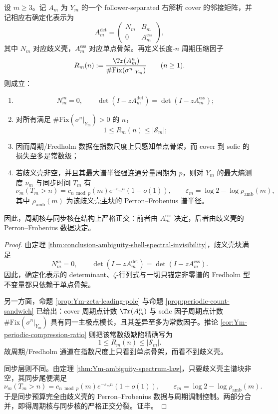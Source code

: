 \begin{theorem}[序列层审计的周期核与同步核严格正交]\label{thm:conclusion-sequence-layer-periodic-sync-kernel-orthogonality}
设 \(m\ge 3\)。记 \(A_m\) 为 \(Y_m\) 的一个 follower-separated 右解析 cover 的邻接矩阵，并记相应右确定化表示为
\[
A_m^{\det}
=
\begin{pmatrix}
N_m & B_m\\
0 & A_m^{\mathrm{ess}}
\end{pmatrix},
\]
其中 \(N_m\) 对应歧义壳，\(A_m^{\mathrm{ess}}\) 对应单点骨架。再定义长度-\(n\) 周期压缩因子
\[
R_m(n):=
\frac{\Tr(A_m^n)}{\#\mathrm{Fix}(\sigma^n|_{Y_m})}
\qquad (n\ge 1).
\]
则成立：
\begin{enumerate}
  \item
  \[
  N_m^m=0,
  \qquad
  \det(I-zA_m^{\det})=\det(I-zA_m^{\mathrm{ess}});
  \]
  \item 对所有满足 \(\#\mathrm{Fix}(\sigma^n|_{Y_m})>0\) 的 \(n\)，
  \[
  1\le R_m(n)\le |\mathcal S_m|;
  \]
  \item 因而周期/Fredholm 数据在指数尺度上只感知单点骨架，而 cover 到 sofic 的损失至多是常数级；
  \item 若歧义壳非空，并且其最大谱半径强连通分量周期为 \(p\)，则对 \(Y_m\) 的最大熵测度 \(\nu_m\) 与同步时间 \(T_m\) 有
  \[
  \nu_m(T_m>n)=c_{n\bmod p}(m)e^{-\varepsilon_m n}(1+o(1)),
  \qquad
  \varepsilon_m=\log 2-\log \rho_{\mathrm{amb}}(m),
  \]
  其中 \(\rho_{\mathrm{amb}}(m)\) 为该歧义壳主块的 Perron--Frobenius 谱半径。
\end{enumerate}
因此，周期核与同步核在结构上严格正交：前者由 \(A_m^{\mathrm{ess}}\) 决定，后者由歧义壳的 Perron--Frobenius 数据决定。
\end{theorem}
\begin{proof}
由定理 \ref{thm:conclusion-ambiguity-shell-spectral-invisibility}，歧义壳块满足
\[
N_m^m=0,
\qquad
\det(I-zA_m^{\det})=\det(I-zA_m^{\mathrm{ess}}).
\]
因此，确定化表示的 determinant、\(\zeta\)-行列式与一切只锚定非零谱的 Fredholm 型不变量都只依赖于单点骨架。

另一方面，命题 \ref{prop:Ym-zeta-leading-pole} 与命题 \ref{prop:periodic-count-sandwich} 已给出：cover 周期点计数 \(\Tr(A_m^n)\) 与 sofic 因子周期点计数 \(\#\mathrm{Fix}(\sigma^n|_{Y_m})\) 具有同一主极点模长，且其差异至多为常数因子。推论 \ref{cor:Ym-periodic-compression-ratio} 则把该常数级缺陷精确写为
\[
1\le R_m(n)\le |\mathcal S_m|.
\]
故周期/Fredholm 通道在指数尺度上只看到单点骨架，而看不到歧义壳。

同步层则不同。由定理 \ref{thm:Ym-ambiguity-spectrum-law}，只要歧义壳主谱块非空，其同步尾便满足
\[
\nu_m(T_m>n)=c_{n\bmod p}(m)e^{-\varepsilon_m n}(1+o(1)),
\qquad
\varepsilon_m=\log 2-\log \rho_{\mathrm{amb}}(m).
\]
于是同步预算完全由歧义壳的 Perron--Frobenius 数据与周期调制控制。两部分合并，即得周期核与同步核的严格正交分裂。证毕。
\end{proof}

